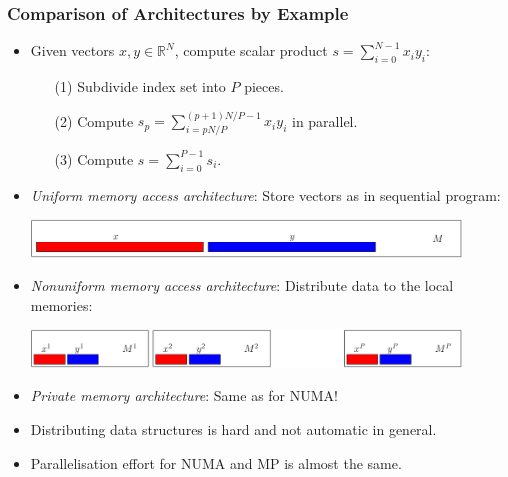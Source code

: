 \begin{frame}
\frametitle{Comparison of Architectures by Example}
\begin{itemize}
\item Given vectors $x,y\in\mathbb{R}^N$, compute scalar product $s =
  \sum_{i=0}^{N-1} x_i y_i$:
\begin{itemize}
\item[(1)] Subdivide index set into $P$ pieces. 
\item[(2)] Compute $s_p=\sum_{i=pN/P}^{(p+1)N/P-1} x_i y_i$ in
  parallel.
\item[(3)] Compute $s = \sum_{i=0}^{P-1} s_i$.
\end{itemize}
\item \textit{Uniform memory access architecture}: Store vectors as in
  sequential program:
\begin{center}
  \includegraphics[width=0.9\textwidth]{EPS/umalayout}
\end{center}
\item \textit{Nonuniform memory access architecture}: Distribute
  data to the local memories:
\begin{center}
  \includegraphics[width=0.9\textwidth]{EPS/numalayout}
\end{center}
\item \textit{Private memory architecture}: Same as for NUMA! 
\item Distributing data structures is hard and not automatic in
  general.
\item Parallelisation effort for NUMA and MP is almost the same.
\end{itemize}
\end{frame}



